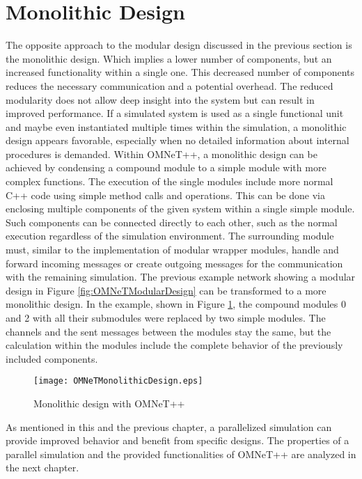 \section{Monolithic Design}
\label{sec:design_monolithic}
The opposite approach to the modular design discussed in the previous section is the monolithic design.
Which implies a lower number of components, but an increased functionality within a single one.
This decreased number of components reduces the necessary communication and a potential overhead.
The reduced modularity does not allow deep insight into the system but can result in improved performance.
If a simulated system is used as a single functional unit and maybe even instantiated multiple times within the simulation, a monolithic design appears favorable, especially when no detailed information about internal procedures is demanded.
Within OMNeT++, a monolithic design can be achieved by condensing a compound module to a simple module with more complex functions.
The execution of the single modules include more normal C++ code using simple method calls and operations.
This can be done via enclosing multiple components of the given system within a single simple module.
Such components can be connected directly to each other, such as the normal execution regardless of the simulation environment.
The surrounding module must, similar to the implementation of modular wrapper modules, handle and forward incoming messages or create outgoing messages for the communication with the remaining simulation.
The previous example network showing a modular design in Figure \ref{fig:OMNeTModularDesign} can be transformed to a more monolithic design.
In the example, shown in Figure \ref{fig:OMNeTMonolithicDesign}, the compound modules 0 and 2 with all their submodules were replaced by two simple modules.
The channels and the sent messages between the modules stay the same, but the calculation within the modules include the complete behavior of the previously included components.

\begin{figure}
    \centering
    \texttt{[image: OMNeTMonolithicDesign.eps]}
    \caption{Monolithic design with OMNeT++}
    \label{fig:OMNeTMonolithicDesign}
\end{figure}

As mentioned in this and the previous chapter, a parallelized simulation can provide improved behavior and benefit from specific designs.
The properties of a parallel simulation and the provided functionalities of OMNeT++ are analyzed in the next chapter.